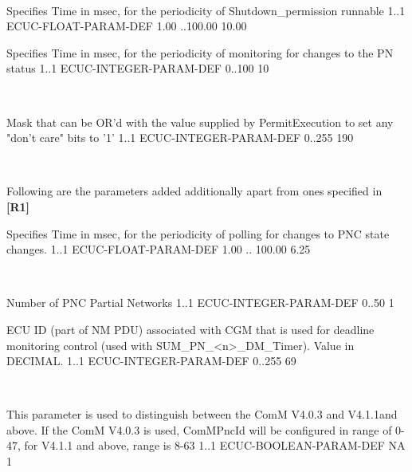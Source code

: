 \\
{}


{Specifies Time in msec, for the periodicity of Shutdown_permission runnable}
{1..1}
{ECUC-FLOAT-PARAM-DEF}
{1.00 ..100.00}
{10.00}



{Specifies Time in msec, for the periodicity of monitoring for changes to the PN status}
{1..1}
{ECUC-INTEGER-PARAM-DEF}
{0..100}
{10}

\\
{}


{Mask that can be OR'd with the value supplied by PermitExecution to set any "don't care" bits to '1'}
{1..1}
{ECUC-INTEGER-PARAM-DEF}
{0..255}
{190}

\\
{   }

Following are the parameters added additionally apart from ones specified in \textbf{[R1]}


{Specifies Time in msec, for the periodicity of polling for changes to PNC state changes.}
{1..1}
{ECUC-FLOAT-PARAM-DEF}
{1.00 .. 100.00}
{6.25}

\\
{}

\medskip

{Number of PNC Partial Networks}
{1..1}
{ECUC-INTEGER-PARAM-DEF}
{0..50}
{1}


{ECU ID (part of NM PDU) associated with CGM that is used for deadline monitoring control (used with SUM_PN_<n>_DM_Timer). Value in DECIMAL.}
{1..1}
{ECUC-INTEGER-PARAM-DEF}
{0..255}
{69}

\\
{}


{This parameter is used to distinguish between the ComM V4.0.3 and V4.1.1and above. If the ComM V4.0.3 is used, ComMPncId will be configured in range of 0-47, for V4.1.1 and above, range is 8-63}
{1..1}
{ECUC-BOOLEAN-PARAM-DEF}
{NA}
{1}

